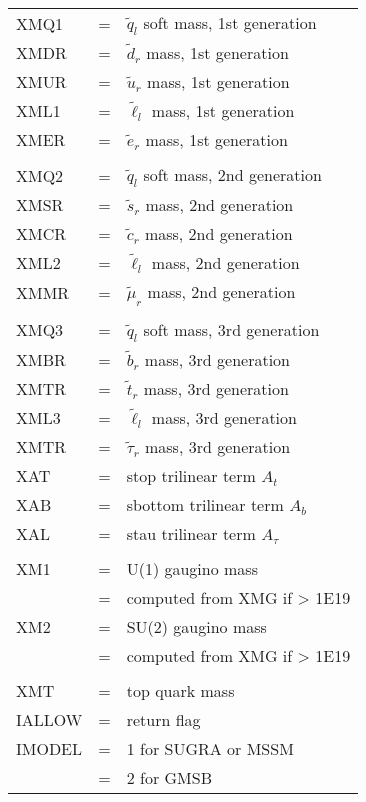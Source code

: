 \noindent
\begin{tabular}{lcl}
      XMQ1   &=& $\tilde q_l$ soft mass, 1st generation\\
      XMDR   &=& $\tilde d_r$ mass, 1st generation\\
      XMUR   &=& $\tilde u_r$ mass, 1st generation\\
      XML1   &=& $\tilde \ell_l$ mass, 1st generation\\
      XMER   &=& $\tilde e_r$ mass, 1st generation\\
\\
      XMQ2   &=& $\tilde q_l$ soft mass, 2nd generation\\
      XMSR   &=& $\tilde s_r$ mass, 2nd generation\\
      XMCR   &=& $\tilde c_r$ mass, 2nd generation\\
      XML2   &=& $\tilde \ell_l$ mass, 2nd generation\\
      XMMR   &=& $\tilde\mu_r$ mass, 2nd generation\\
\\
      XMQ3   &=& $\tilde q_l$ soft mass, 3rd generation\\
      XMBR   &=& $\tilde b_r$ mass, 3rd generation\\
      XMTR   &=& $\tilde t_r$ mass, 3rd generation\\
      XML3   &=& $\tilde \ell_l$ mass, 3rd generation\\
      XMTR   &=& $\tilde \tau_r$ mass, 3rd generation\\
      XAT    &=& stop trilinear term $A_t$\\
      XAB    &=& sbottom trilinear term $A_b$\\
      XAL    &=& stau trilinear term $A_\tau$\\
\\
      XM1    &=& U(1) gaugino mass\\
             &=& computed from XMG if > 1E19\\
      XM2    &=& SU(2) gaugino mass\\
             &=& computed from XMG if > 1E19\\
\\
      XMT    &=& top quark mass\\
      IALLOW &=& return flag\\
      IMODEL &=& 1 for SUGRA or MSSM\\
             &=& 2 for GMSB
\end{tabular}
\smallskip

